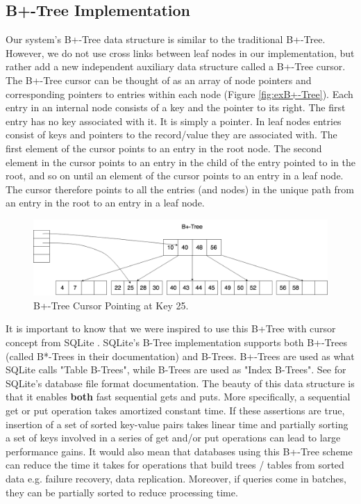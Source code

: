 \subsection{B+-Tree Implementation} \label{sec:B+-tree implementation}


Our system's B+-Tree data structure is similar to the traditional B+-Tree. However, we do not use cross links between leaf nodes in our implementation, but rather add a new independent auxiliary data structure called a B+-Tree cursor. The B+-Tree cursor can be thought of as an array of node pointers and corresponding pointers to entries within each node (Figure \ref{fig:exB+-Tree}). Each entry in an internal node consists of a key and the pointer to its right. The first entry has no key associated with it. It is simply a pointer. In leaf nodes entries consist of keys and pointers to the record/value they are associated with. The first element of the cursor points to an entry in the root node. The second element in the cursor points to an entry in the child of the entry pointed to in the root, and so on until an element of the cursor points to an entry in a leaf node. The cursor therefore points to all the entries (and nodes) in the unique path from an entry in the root to an entry in a leaf node. 

\begin{figure}[h]
    \centering
    \includegraphics[scale=0.30]{figures/BtreeCursor.png}
    \caption{B+-Tree Cursor Pointing at Key 25.}
    \label{fig:exB+Cursor}
\end{figure}

It is important to know that we were inspired to use this B+Tree with cursor concept from SQLite \cite{SQLite}. SQLite's B-Tree implementation supports both B+-Trees (called B*-Trees in their documentation) and B-Trees. B+-Trees are used as what SQLite calls "Table B-Trees", while B-Trees are used as "Index B-Trees". See \cite{SQLiteFileFormat} for SQLite's database file format documentation. The beauty of this data structure is that it enables \textbf{both} fast sequential gets and puts. More specifically, a sequential get or put operation takes amortized constant time. If these assertions are true, insertion of a set of sorted key-value pairs takes linear time and partially sorting a set of keys involved in a series of get and/or put operations can lead to large performance gains. It would also mean that databases using this B+-Tree scheme can reduce the time it takes for operations that build trees / tables from sorted data e.g. failure recovery, data replication. Moreover, if queries come in batches, they can be partially sorted to reduce processing time. 



